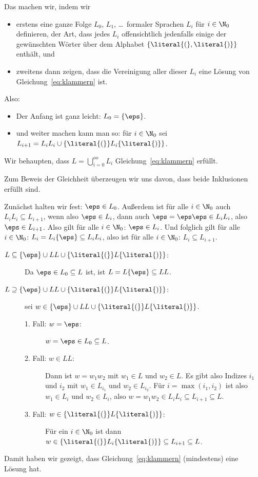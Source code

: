 Das machen wir, indem wir
\begin{itemize}
\item erstens eine ganze Folge $L_0$, $L_1$, \dots\ formaler Sprachen
  $L_i$ für $i\in\N_0$ definieren, der Art, dass jedes $L_i$
  offensichtlich jedenfalls einige der gewünschten Wörter über dem
  Alphabet $\{\literal{(}, \literal{)}\}$ enthält, und
\item zweitens dann zeigen, dass die Vereinigung aller dieser $L_i$
  eine Lösung von Gleichung~\ref{eq:klammern} ist.
\end{itemize}
%
Also:
%
\begin{itemize}
\item Der Anfang ist ganz leicht: $L_0 = \{\eps\}$.
\item und weiter machen kann man so: für $i\in\N_0$ sei \\
  $L_{i+1}= L_iL_i \cup \{\literal{(}\} L_i \{\literal{)}\}$.
\end{itemize}
%
Wir behaupten, dass $L=\bigcup_{i=0}^{oo} L_i$
Gleichung~\ref{eq:klammern} erfüllt.

Zum Beweis der Gleichheit überzeugen wir uns davon, dass beide
Inklusionen erfüllt sind. 

Zunächst halten wir fest: $\eps\in L_0$. Außerdem ist für alle $i\in
\N_0$ auch $L_iL_i\subseteq L_{i+1}$, wenn also $\eps\in L_i$, dann
auch $\eps=\eps\eps\in L_iL_i$, also $\eps\in L_{i+1}$. Also gilt für
alle $i\in \N_0$: $\eps\in L_i$.  Und folglich gilt für alle
$i\in\N_0$: $L_i=L_i\{\eps\}\subseteq L_i L_i$, also ist für alle
$i\in\N_0$: $L_i\subseteq L_{i+1}$.

\begin{description}
\item[$L\subseteq \{ \eps \} \cup LL \cup \{\literal{(}\} L
  \{\literal{)}\}$:] Da $\eps\in L_0\subseteq L$ ist, ist
  $L=L\{\eps\}\subseteq LL$.
\item[$L\supseteq \{ \eps \} \cup LL \cup \{\literal{(}\} L
  \{\literal{)}\}$:] sei $w\in \{ \eps \} \cup LL \cup
  \{\literal{(}\} L \{\literal{)}\}$. 
  \begin{description}
  \item[1. Fall: $w=\eps$:] $w=\eps\in L_0\subseteq L$.
  \item[2. Fall: $w\in LL$:] Dann ist $w=w_1w_2$ mit $w_1\in L$ und
    $w_2\in L$. Es gibt also Indizes $i_1$ und $i_2$ mit $w_1\in
    L_{i_1}$ und $w_2\in L_{i_2}$. Für $i=\max(i_1,i_2)$ ist also
    $w_1\in L_i$ und $w_2\in L_i$, also $w=w_1w_2\in L_iL_i\subseteq
    L_{i+1}\subseteq L$.
  \item[3. Fall: $w\in \{\literal{(}\} L \{\literal{)}\}$:] Für ein
    $i\in \N_0$ ist dann $w\in \{\literal{(}\} L_i
    \{\literal{)}\}\subseteq L_{i+1}\subseteq L$.
  \end{description}
\end{description}
%
Damit haben wir gezeigt, dass Gleichung~\ref{eq:klammern} (mindestens)
eine Lösung hat.

